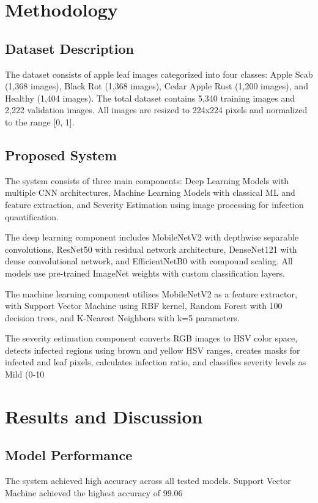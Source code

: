 \documentclass[conference]{IEEEtran}
\begin{document}
\section{Methodology}
\subsection{Dataset Description}
The dataset consists of apple leaf images categorized into four classes: Apple Scab (1,368 images), Black Rot (1,368 images), Cedar Apple Rust (1,200 images), and Healthy (1,404 images). The total dataset contains 5,340 training images and 2,222 validation images. All images are resized to 224x224 pixels and normalized to the range [0, 1].

\subsection{Proposed System}
The system consists of three main components: Deep Learning Models with multiple CNN architectures, Machine Learning Models with classical ML and feature extraction, and Severity Estimation using image processing for infection quantification.

The deep learning component includes MobileNetV2 with depthwise separable convolutions, ResNet50 with residual network architecture, DenseNet121 with dense convolutional network, and EfficientNetB0 with compound scaling. All models use pre-trained ImageNet weights with custom classification layers.

The machine learning component utilizes MobileNetV2 as a feature extractor, with Support Vector Machine using RBF kernel, Random Forest with 100 decision trees, and K-Nearest Neighbors with k=5 parameters.

The severity estimation component converts RGB images to HSV color space, detects infected regions using brown and yellow HSV ranges, creates masks for infected and leaf pixels, calculates infection ratio, and classifies severity levels as Mild (0-10%

\section{Results and Discussion}
\subsection{Model Performance}
The system achieved high accuracy across all tested models. Support Vector Machine achieved the highest accuracy of 99.06%
\end{document}
